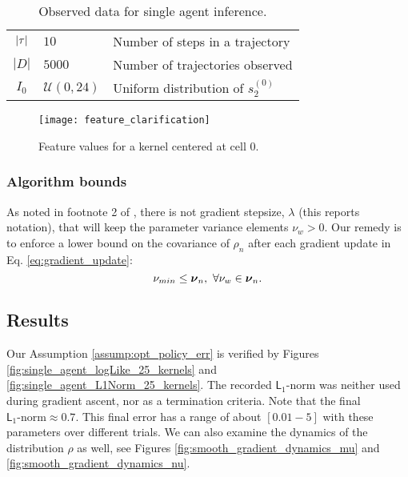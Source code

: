     \begin{table}[H]
        \centering
        \begin{tabular}{c|l l}
                $|\tau|$ & $10$ & Number of steps in a trajectory \\
                $|D|$ & $5000$ & Number of trajectories observed \\
                $I_0$ & $\mathcal{U}(0,24)$ & Uniform distribution of $s_2^{(0)}$ \\
        \end{tabular}
        \caption{Observed data for single agent inference.}
        \label{table:single_agent_data_set}
\end{table}

    \begin{figure}[h]
        \texttt{[image: feature\_clarification]}
        \caption{Feature values for a kernel centered at cell $0$.}
        \label{fig:kernel_visualization}
    \end{figure}

\subsubsection{Algorithm bounds}

    As noted in footnote 2 of \cite{williams1992simple}, there is not gradient stepsize, $\lambda$ (this reports
    notation), that will keep the parameter variance elements $\nu_w >0$. Our remedy is to enforce a lower bound on the
    covariance of $\rho_n$ after each gradient update in Eq. \ref{eq:gradient_update}:
    \begin{equation}\label{eq:param_var_bounds}
    \nu_{min} \leq \boldsymbol{\mathbb{\nu}}_n,\ \forall \nu_w \in \boldsymbol{\mathbb{\nu}}_n.
    \end{equation}

\subsection{Results}\label{sec:single_agent_25K_results}
    Our Assumption \ref{assump:opt_policy_err} is verified by Figures \ref{fig:single_agent_logLike_25_kernels} and
    \ref{fig:single_agent_L1Norm_25_kernels}. The recorded $\mathsf{L}_1$-norm was neither used during gradient
    ascent, nor as a termination criteria. Note that the final $\mathsf{L}_1\text{-norm} \approx 0.7$. This final
    error has a range of about $[0.01-5]$ with these parameters over different trials.  We can also examine the dynamics
    of the distribution $\rho$ as well, see Figures \ref{fig:smooth_gradient_dynamics_mu} and
    \ref{fig:smooth_gradient_dynamics_nu}.

